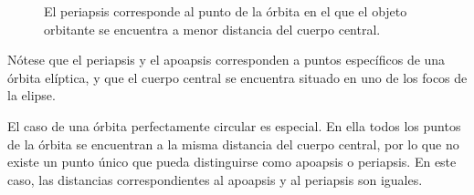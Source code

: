 \begin{figure}[!ht]
  \centering
  \caption{El periapsis corresponde al punto de la órbita en el que el objeto
  orbitante se encuentra a menor distancia del cuerpo central.}
  \label{fig_periapsis}
\end{figure}

Nótese que el periapsis y el apoapsis corresponden a puntos específicos de una órbita elíptica, y que el cuerpo central se encuentra situado en uno de los focos de la elipse.

El caso de una órbita perfectamente circular es especial. En ella todos los puntos de la órbita se encuentran a la misma distancia del cuerpo central, por lo que no existe un punto único que pueda distinguirse como apoapsis o periapsis. En este caso, las distancias correspondientes al apoapsis y al periapsis son iguales.
